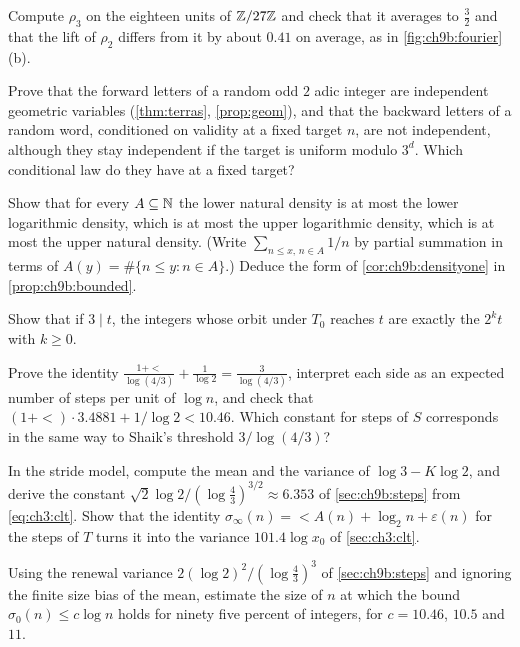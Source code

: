 \begin{exercise}\label{ex:ch9b:rhothree}
Compute $\rho_3$ on the eighteen units of $\mathbb{Z}/27\mathbb{Z}$ and check that it averages to $\tfrac32$ and that the lift of $\rho_2$ differs from it by about $0.41$ on average, as in \cref{fig:ch9b:fourier}(b).
\end{exercise}

\begin{exercise}\label{ex:ch9b:conditional}
Prove that the forward letters of a random odd $2$ adic integer are independent geometric variables (\cref{thm:terras}, \cref{prop:geom}), and that the backward letters of a random word, conditioned on validity at a fixed target $n$, are not independent, although they stay independent if the target is uniform modulo $3^d$. Which conditional law do they have at a fixed target?
\end{exercise}

\begin{exercise}\label{ex:ch9b:densities}
Show that for every $A\subseteq\mathbb{N}$ the lower natural density is at most the lower logarithmic density, which is at most the upper logarithmic density, which is at most the upper natural density. (Write $\sum_{n\le x,\,n\in A}1/n$ by partial summation in terms of $A(y)=\#\{n\le y:n\in A\}$.) Deduce the form of \cref{cor:ch9b:densityone} in \cref{prop:ch9b:bounded}.
\end{exercise}

\begin{exercise}\label{ex:ch9b:three}
Show that if $3\mid t$, the integers whose orbit under $T_0$ reaches $t$ are exactly the $2^kt$ with $k\ge0$.
\end{exercise}

\begin{exercise}
Prove the identity $\frac{1+\lt}{\log(4/3)}+\frac1{\log2}=\frac3{\log(4/3)}$, interpret each side as an expected number of steps per unit of $\log n$, and check that $(1+\lt)\cdot3.4881+1/\log2<10.46$. Which constant for steps of $S$ corresponds in the same way to Shaik's threshold $3/\log(4/3)$?
\end{exercise}

\begin{exercise}
In the stride model, compute the mean and the variance of $\log3-K\log2$, and derive the constant $\sqrt2\log2/(\log\frac43)^{3/2}\approx6.353$ of \cref{sec:ch9b:steps} from \eqref{eq:ch3:clt}. Show that the identity $\sigma_\infty(n)=\lt A(n)+\log_2n+\varepsilon(n)$ for the steps of $T$ turns it into the variance $101.4\log x_0$ of \cref{sec:ch3:clt}.
\end{exercise}

\begin{exercise}\label{ex:ch9b:coverage}
Using the renewal variance $2(\log2)^2/(\log\frac43)^3$ of \cref{sec:ch9b:steps} and ignoring the finite size bias of the mean, estimate the size of $n$ at which the bound $\sigma_0(n)\le c\log n$ holds for ninety five percent of integers, for $c=10.46$, $10.5$ and $11$.
\end{exercise}
